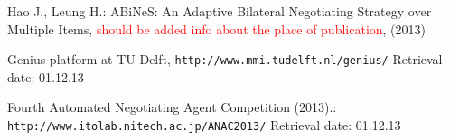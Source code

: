 \documentclass[html]{report}    %
\begin{document}
\begin{thebibliography}{}

Hao J., Leung H.:
ABiNeS: An Adaptive Bilateral Negotiating Strategy over Multiple Items,
\textcolor{red}{should be added info about the place of publication}, (2013)

Genius platform at TU Delft,
\texttt{http://www.mmi.tudelft.nl/genius/} Retrieval date: 01.12.13

Fourth Automated Negotiating Agent Competition (2013).:
\texttt{http://www.itolab.nitech.ac.jp/ANAC2013/} Retrieval date: 01.12.13

\end{thebibliography}
\end{document}
